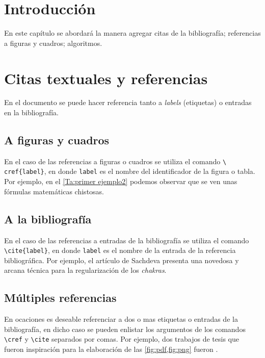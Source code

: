 \section{Introducción}

En este capítulo se abordará la manera agregar citas de la bibliografía; referencias a figuras y 
cuadros; algoritmos.\\

\section{Citas textuales y referencias}

En el documento se puede hacer referencia tanto a \emph{labels} (etiquetas) o entradas en la 
bibliografía.\\

\subsection{A figuras y cuadros}
En el caso de las referencias a figuras o cuadros se utiliza el comando \texttt{\textbackslash 
cref\{label\}}, en donde \texttt{label} es el nombre del identificador de la figura o tabla. Por 
ejemplo, en el \cref{Ta:primer ejemplo2} podemos observar que se ven unas fórmulas matemáticas 
chistosas.\\

\subsection{A la bibliografía}
En el caso de las referencias a entradas de la bibliografía se utiliza el comando 
\texttt{\textbackslash cite\{label\}}, en donde \texttt{label} es el nombre de la entrada de la 
referencia bibliográfica. Por ejemplo, el artículo de Sachdeva \cite{chackra} presenta una 
novedosa y arcana técnica para la regularización de los \emph{chakras}.\\

\subsection{Múltiples referencias}
En ocaciones es deseable referenciar a dos o mas etiquetas o entradas de la bibliografía, en dicho 
caso se pueden enlistar los argumentos de los comandos \texttt{\textbackslash cref} y 
\texttt{\textbackslash cite} separados por comas. Por ejemplo, dos trabajos de tesis que fueron 
inspiración para la elaboración de las \cref{fig:pdf,fig:png} fueron 
\cite{ejemplo_maestria,ejemplo_tesis_doctoral}.

